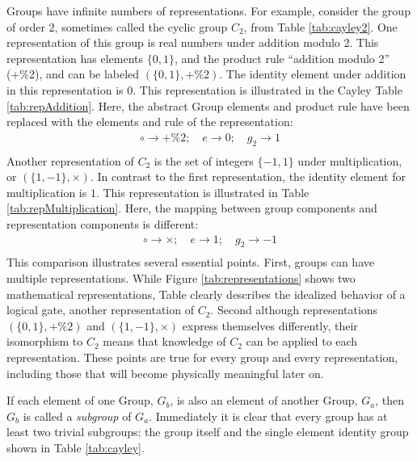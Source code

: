 Groups have infinite numbers of representations.
For example, consider the group of order 2, sometimes called the cyclic group $C_2$, from Table \ref{tab:cayley2}.
One representation of this group is real numbers under addition modulo 2.
This representation has elements $\{0,1\}$, and the product rule ``addition modulo 2'' (+\%2), and can be labeled $(\{0,1\},+\%2)$.
The identity element under addition in this representation is $0$.
This representation is illustrated in the Cayley Table \ref{tab:repAddition}. Here, the abstract Group elements and product rule have been replaced with the elements and rule of the representation:
\begin{equation}\begin{split}
    \circ\to+\%2; \quad e\to0; \quad g_2\to1 \\
\end{split}\end{equation} 
%
Another representation of $C_2$ is the set of integers $\{-1,1\}$ under multiplication, or $(\{1,-1\},\times)$.
In contrast to the first representation, the identity element for multiplication is $1$.
This representation is illustrated in Table \ref{tab:repMultiplication}. Here, the mapping between group components and representation components is different:
\begin{equation}\begin{split}
    \circ\to\times; \quad e\to1; \quad g_2\to-1 \\
\end{split}\end{equation} 
%
This comparison illustrates several essential points.
First, groups can have multiple representations. While Figure \ref{tab:representations} shows two mathematical representations, Table \label{tab:repAddition} clearly describes the idealized behavior of a logical  gate, another representation of $C_2$.
Second although representations $(\{0,1\},+\%2)$ and $(\{1,-1\},\times)$ express themselves differently, their isomorphism to $C_2$ means that knowledge of $C_2$ can be applied to each representation.
These points are true for every group and every representation, including those that will become physically meaningful later on.

If each element of one Group, $G_b$, is also an element of another Group, $G_a$, then $G_b$ is called a \emph{subgroup} of $G_a$.
Immediately it is clear that every group has at least two trivial subgroups: the group itself and the single element identity group shown in Table \ref{tab:cayley}.

